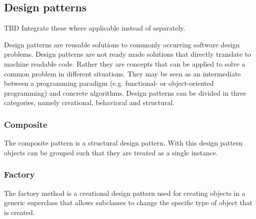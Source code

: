 \subsection{Design patterns}
TBD Integrate these where applicable instead of separately.

Design patterns are reusable solutions to commonly occurring software design problems. Design patterns are not ready made solutions that directly translate to machine readable code. Rather they are concepts that can be applied to solve a common problem in different situations. They may be seen as an intermediate between a programming paradigm (e.g. functional- or object-oriented programming) and
concrete algorithms. Design patterns can be divided in three categories, namely creational, behavioral and structural.

\subsubsection{Composite}
The composite pattern is a structural design pattern. With this design pattern objects can be grouped such that they are treated as a
single instance.

\subsubsection{Factory}
The factory method is a creational design pattern used for creating objects in a generic superclass that allows subclasses to change the
specific type of object that is created.

